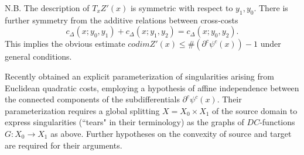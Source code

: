 \documentclass[12pt]{amsart}
\theoremstyle{definition}
\theoremstyle{remark}
\newcommand{\del}{\partial}
\newcommand{\cd}{c_\Delta}
\begin{document}


N.B. The description of $T_{x} Z'(x)$ is symmetric with respect to $y_1, y_0$. There is further symmetry from the additive relations between cross-costs $$\cd(x;y_0,y_1)+\cd(x;y_1, y_2)=\cd(x;y_0, y_2).$$ This implies the obvious estimate $ codim Z'(x) \leq \#(\del^c \psi^c (x))-1$ under general conditions. 







 
 



Recently \cite{KitMc} obtained an explicit parameterization of singularities arising from Euclidean quadratic costs, employing a hypothesis of affine independence between the connected components of the subdifferentials $\del^c \psi^c(x)$. Their parameterization requires a global splitting $X=X_0 \times X_1$ of the source domain to express singularities (``tears" in their terminology) as the graphs of $DC$-functions $G: X_0 \to X_1$ as above. Further hypotheses on the convexity of source and target are required for their arguments. 
\end{document}
